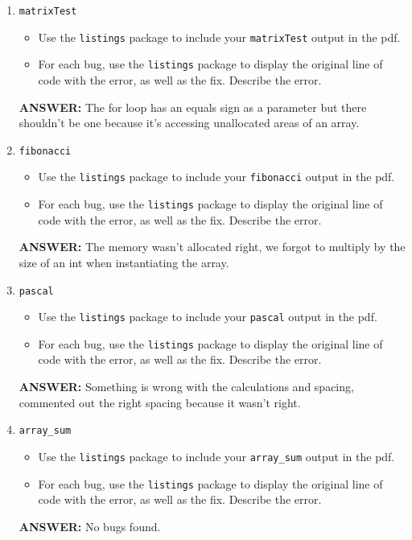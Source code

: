 \begin{enumerate}
    \item \texttt{matrixTest}
    \begin{itemize}
        \item Use the \texttt{listings} package to include your \texttt{matrixTest} output in the pdf.
        \item For each bug, use the \texttt{listings} package to display the original line of code with the error, as well as the fix.  Describe the error.            
    \end{itemize}
    \textbf{ANSWER:} 
    The for loop has an equals sign as a parameter but there shouldn't be one because it's accessing unallocated areas of an array.

    \item \texttt{fibonacci}
    \begin{itemize}
        \item Use the \texttt{listings} package to include your \texttt{fibonacci} output in the pdf.
        \item For each bug, use the \texttt{listings} package to display the original line of code with the error, as well as the fix.  Describe the error.
    \end{itemize}
    \textbf{ANSWER:} 
    The memory wasn't allocated right, we forgot to multiply by the size of an int when instantiating the array.

    \item \texttt{pascal}
    \begin{itemize}
        \item Use the \texttt{listings} package to include your \texttt{pascal} output in the pdf.
        \item For each bug, use the \texttt{listings} package to display the original line of code with the error, as well as the fix.  Describe the error.
    \end{itemize}
    \textbf{ANSWER:} 
    Something is wrong with the calculations and spacing, commented out the right spacing because it wasn't right.

    \item \texttt{array\_sum}
    \begin{itemize}
        \item Use the \texttt{listings} package to include your \texttt{array\_sum} output in the pdf.
        \item For each bug, use the \texttt{listings} package to display the original line of code with the error, as well as the fix.  Describe the error.
    \end{itemize}
    \textbf{ANSWER:} 
    No bugs found.


\end{enumerate}
